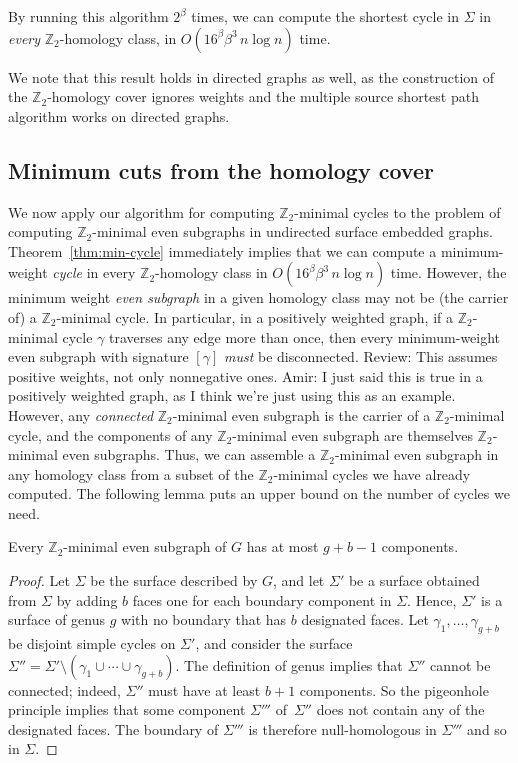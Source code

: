\documentclass[letterpaper,review]{siamart190516}
\def\Z{\mathbb{Z}}
\def\modified#1{\color{blue}#1 \color{black}}
\def\anote#1{\color{purple}Amir: #1 \color{black}}
\def\rnote#1{\color{red}Review: #1 \color{black}}
\begin{document}
{By running this algorithm $2^\beta$ times, we can compute the shortest cycle in $\Sigma$ in
\emph{every} $\Z_2$-homology class, in $O(16^\beta \beta^3\, n\log n)$ time.

We note that this result holds in directed graphs as well, as the construction of the $\Z_2$-homology cover ignores weights and the multiple source shortest path algorithm works on directed graphs.


\subsection{Minimum cuts from the homology cover}
\label{sec:homcover_mincut}

We now apply our algorithm for computing $\Z_2$-minimal cycles to the problem of computing $\Z_2$-minimal even subgraphs in undirected surface embedded graphs.
Theorem~\ref{thm:min-cycle} immediately implies that we can compute a minimum-weight \emph{cycle} in
every $\Z_2$-homology class in $O(16^\beta \beta^3\, n\log n)$ time.  However, the minimum weight \emph{even subgraph} in a given homology class may not be (the carrier of) a $\Z_2$-minimal cycle.  In particular, \modified{in a positively weighted graph,} if a $\Z_2$-minimal cycle $\gamma$ traverses any edge more than once, then every minimum-weight even subgraph with signature $[\gamma]$ \emph{must} be disconnected.
\rnote{This assumes positive weights, not only nonnegative ones. }\anote{I just said this is true in a positively weighted graph, as I think we're just using this as an example.}
However, any \emph{connected} $\Z_2$-minimal even subgraph is the carrier of a $\Z_2$-minimal cycle, and the components of any $\Z_2$-minimal even subgraph are themselves $\Z_2$-minimal even subgraphs.  Thus, we can assemble a $\Z_2$-minimal even subgraph in any homology class from a subset of the $\Z_2$-minimal cycles we have already computed.  The following lemma puts an upper bound on the number of cycles we need.

\begin{lemma}
\label{lem:even-comps}
Every $\Z_2$-minimal even subgraph of $G$ has at most $g+b-1$ components.
\end{lemma}

\begin{proof}

\modified{Let $\Sigma$ be the surface described by $G$, and let $\Sigma'$ be a surface obtained from $\Sigma$ by adding $b$ faces one for each boundary component in $\Sigma$.  Hence, $\Sigma'$ is a surface of genus $g$ with no boundary that has $b$ designated faces.
Let $\gamma_1, \dots, \gamma_{g+b}$ be disjoint simple cycles on $\Sigma'$, and consider the surface $\Sigma'' = \Sigma' \setminus (\gamma_1 \cup \cdots \cup \gamma_{g+b})$.  The definition of genus implies that $\Sigma''$ cannot be connected; indeed, $\Sigma''$ must have at least $b+1$ components.  So the pigeonhole principle implies that some component $\Sigma'''$ of~$\Sigma''$ does not contain any of the designated faces.  The boundary of $\Sigma'''$ is therefore null-homologous in $\Sigma'''$ and so in $\Sigma$.}


\end{proof}}
\end{document}
